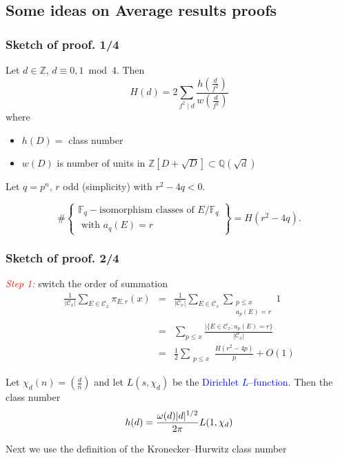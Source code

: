 \documentclass[10pt,handout]{beamer} %
\newcommand{\Q}{\mathbb Q}
\newcommand{\Z}{\mathbb Z}
\newcommand{\F}{\mathbb F}
\theoremstyle{definition}
\begin{document}
\subsection{Some ideas on Average results proofs}

\begin{frame}
\frametitle{Sketch of proof. 1/4}

\begin{definition} \pause
Let $d\in\Z$, $d\equiv0,1\bmod 4$. Then 
$$H(d)=2\sum_{f^2\mid d}\frac{h\left(\frac d{f^2}\right)}{w\left(\frac d{f^2}\right)}$$\pause
where \begin{itemize}
       \item $h(D)=$ class number
       \item $w(D)$ is number of units in $\Z[D+\sqrt{D}]\subset{\Q}(\sqrt{d})$
      \end{itemize}
\end{definition}\pause

\begin{theorem}\pause
Let $q=p^n$, $r$ odd (simplicity) with $r^2-4q<0$.\pause

$$\#\left\{\begin{array}{l}
            \F_q-\text{isomorphism classes of } E/\F_q \\
            \text{ with }a_q(E)=r
           \end{array}\right\}= H(r^2-4q).$$
\end{theorem}
 
\end{frame}

\begin{frame}
\frametitle{Sketch of proof.  2/4}

\begin{block}{\textcolor{red}{\textit{Step 1:}} switch the order of summation}\pause
\begin{eqnarray*}
 \frac{1}{|\mathcal C_x|}\sum_{E\in\mathcal C_x}\pi_{E,r}(x) &=&\frac{1}{|\mathcal C_x|}\sum_{E\in\mathcal C_x}\sum_{\substack{ p\le x\\ a_p(E)=r}}1 \\
 &=&\sum_{p\le x}\frac{|\{E\in\mathcal C_x: a_p(E)=r\}}{|\mathcal C_x|}\\
 &=& \frac12 \sum_{\substack{p\leq x}}
 \frac{H(r^2-4p)}{p}+O(1)
\end{eqnarray*} 
\end{block}\pause

\begin{theorem}\pause
 Let  $\chi_d(n)=\left(\frac dn\right)$ and let $L(s,\chi_{d})$ be the \textcolor{blue}{Dirichlet $L$--function}. \pause Then the class
 number
$$h(d)=\frac{\omega(d)|d|^{1/2}}{2\pi}L(1,\chi_{d})\vspace*{-12pt}$$
 \end{theorem}\pause

Next we use the definition of the \alert{Kronecker--Hurwitz class number}
 \end{frame}
\end{document}
